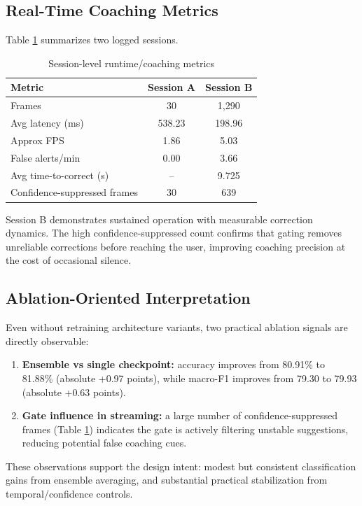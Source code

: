 \documentclass[conference]{IEEEtran}
\begin{document}
\subsection{Real-Time Coaching Metrics}
Table \ref{tab:runtime_results} summarizes two logged sessions.

\begin{table}[t]
\caption{Session-level runtime/coaching metrics}
\label{tab:runtime_results}
\centering
\begin{tabular}{lcc}
\toprule
Metric & Session A & Session B \\
\midrule
Frames & 30 & 1{,}290 \\
Avg latency (ms) & 538.23 & 198.96 \\
Approx FPS & 1.86 & 5.03 \\
False alerts/min & 0.00 & 3.66 \\
Avg time-to-correct (s) & -- & 9.725 \\
Confidence-suppressed frames & 30 & 639 \\
\bottomrule
\end{tabular}
\end{table}

Session B demonstrates sustained operation with measurable correction dynamics. The high confidence-suppressed count confirms that gating removes unreliable corrections before reaching the user, improving coaching precision at the cost of occasional silence.

\subsection{Ablation-Oriented Interpretation}
Even without retraining architecture variants, two practical ablation signals are directly observable:
\begin{enumerate}
\item \textbf{Ensemble vs single checkpoint:} accuracy improves from 80.91\% to 81.88\% (absolute +0.97 points), while macro-F1 improves from 79.30 to 79.93 (absolute +0.63 points).
\item \textbf{Gate influence in streaming:} a large number of confidence-suppressed frames (Table \ref{tab:runtime_results}) indicates the gate is actively filtering unstable suggestions, reducing potential false coaching cues.
\end{enumerate}

These observations support the design intent: modest but consistent classification gains from ensemble averaging, and substantial practical stabilization from temporal/confidence controls.
\end{document}
